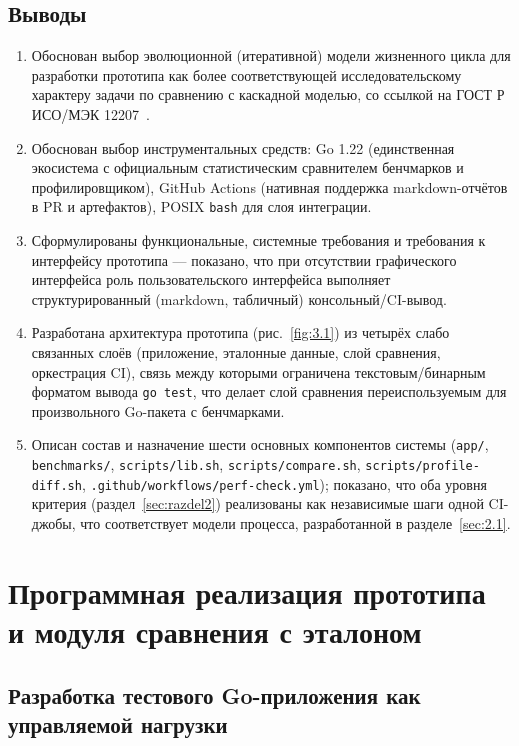 \documentclass[12pt,a4paper]{article}
\newcommand{\newrazdel}{\clearpage}
\numberwithin{equation}{section}
\begin{document}
\subsection{Выводы}

\begin{enumerate}
\item Обоснован выбор эволюционной (итеративной) модели жизненного цикла
для разработки прототипа как более соответствующей исследовательскому
характеру задачи по сравнению с каскадной моделью, со ссылкой на
ГОСТ Р ИСО/МЭК 12207~\cite{gost12207}.
\item Обоснован выбор инструментальных средств: Go 1.22 (единственная
экосистема с официальным статистическим сравнителем бенчмарков и
профилировщиком), GitHub Actions (нативная поддержка markdown-отчётов в PR
и артефактов), POSIX \texttt{bash} для слоя интеграции.
\item Сформулированы функциональные, системные требования и требования к
интерфейсу прототипа — показано, что при отсутствии графического
интерфейса роль пользовательского интерфейса выполняет
структурированный (markdown, табличный) консольный/CI-вывод.
\item Разработана архитектура прототипа (рис.~\ref{fig:3.1}) из четырёх
слабо связанных слоёв (приложение, эталонные данные, слой сравнения,
оркестрация CI), связь между которыми ограничена текстовым/бинарным
форматом вывода \texttt{go test}, что делает слой сравнения переиспользуемым
для произвольного Go-пакета с бенчмарками.
\item Описан состав и назначение шести основных компонентов системы
(\texttt{app/\allowbreak }, \texttt{benchmarks/\allowbreak }, \texttt{scripts/\allowbreak lib.sh},
\texttt{scripts/\allowbreak compare.sh}, \texttt{scripts/\allowbreak profile-diff.sh},
\texttt{.github/\allowbreak workflows/\allowbreak perf-check.yml}); показано, что оба уровня
критерия (раздел~\ref{sec:razdel2}) реализованы как независимые шаги одной
CI-джобы, что соответствует модели процесса, разработанной в
разделе~\ref{sec:2.1}.
\end{enumerate}

\newrazdel
\section{Программная реализация прототипа и модуля сравнения с эталоном}
\label{sec:razdel4}

\subsection{Разработка тестового Go-приложения как управляемой нагрузки}
\label{sec:4.1}
\end{document}

